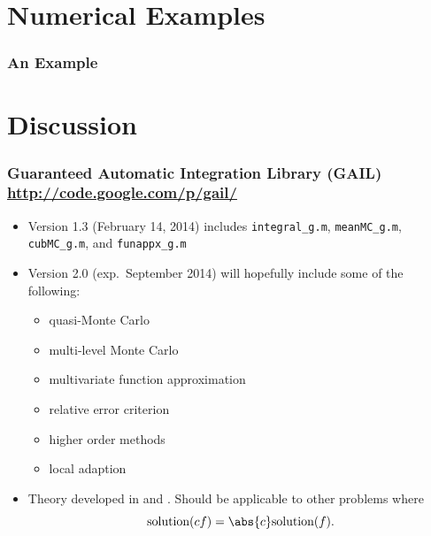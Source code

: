 \documentclass[10pt,compress]{beamer} %
\begin{document}
\section{Numerical Examples}
\begin{frame}\frametitle{An Example}

\end{frame}

\section{Discussion}
\begin{frame} \frametitle{Guaranteed Automatic Integration Library (GAIL) \url{http://code.google.com/p/gail/}}

\begin{itemize}

\item Version 1.3 (February 14, 2014) \cite{ChoEtal14a} includes \texttt{integral\_g.m}, \texttt{meanMC\_g.m}, \texttt{cubMC\_g.m}, and \texttt{funappx\_g.m}

\item Version 2.0 (exp.\ September 2014) will hopefully include some of the following:
\begin{itemize}
\item quasi-Monte Carlo
\item multi-level Monte Carlo
\item multivariate function approximation
\item relative error criterion

\item higher order methods

\item local adaption

\end{itemize}

\item Theory developed in  and .  Should be applicable to other problems where
\[
\text{solution}(cf)=\abs{c}\text{solution}(f).
\]

\end{itemize}
\end{frame}

\end{document}
